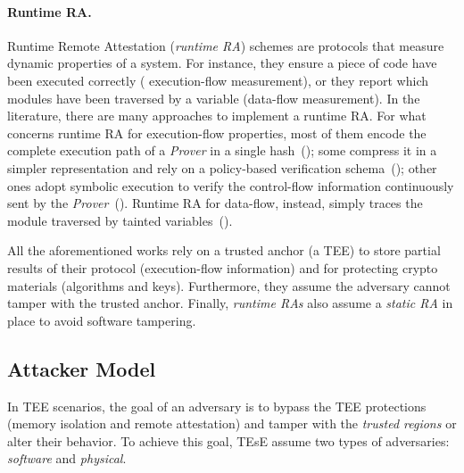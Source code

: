 \paragraph{Runtime RA.}


Runtime Remote Attestation (\emph{runtime RA}) schemes are protocols that 
measure dynamic properties of a system.
For instance, they ensure a piece of code have been executed correctly (\ie 
execution-flow measurement), or they report which modules have been traversed 
by a variable (\ie data-flow measurement).
In the literature, there are many approaches to implement a runtime RA.
For what concerns runtime RA for execution-flow properties, most of them encode 
the complete execution path of a \emph{Prover} in a single 
hash~(\cite{abera2016c,zeitouni2017atrium,dessouky2017fat}); 
some compress it in a simpler representation and rely on a 
policy-based verification schema~(\cite{aberadiat}); 
other ones adopt symbolic execution to verify the control-flow information 
continuously sent by the 
\emph{Prover}~(\cite{Dessouky:2018:LLH:3240765.3240821}).
Runtime RA for data-flow, instead, simply traces the module traversed by 
tainted variables~(\cite{apex,aberadiat}).

All the aforementioned works rely on a trusted anchor (\eg a TEE) to store 
partial results of their protocol (\eg execution-flow information) and for 
protecting crypto materials (\ie algorithms and keys).
Furthermore, they assume the adversary cannot tamper with the trusted anchor.
Finally, \emph{runtime RAs} also assume a \emph{static RA} in place to avoid 
software tampering.

\subsection{Attacker Model}
\label{ssec:attacker-model}

In TEE scenarios, the goal of an adversary is to bypass the TEE protections 
(\ie memory isolation and remote attestation) and tamper with the \emph{trusted 
regions} or alter their behavior.
To achieve this goal, TEsE assume two types of adversaries: \emph{software} and 
\emph{physical}.


